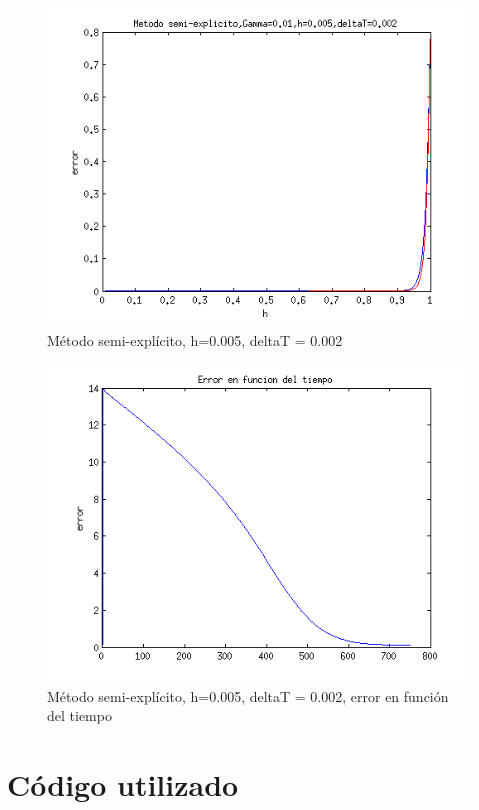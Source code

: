 \documentclass[11pt]{article}
\begin{document}
\begin{figure}[tbh]
	\centering
		\includegraphics[width=1.0\textwidth]{imagen21.png}
	\caption{M\'etodo semi-expl\'icito, h=0.005, deltaT = 0.002}
	\label{fig:Fig1}
\end{figure}

\begin{figure}[tbh]
	\centering
		\includegraphics[width=1.0\textwidth]{imagen22.png}
	\caption{M\'etodo semi-expl\'icito, h=0.005, deltaT = 0.002, error en funci\'on del tiempo}
	\label{fig:Fig1}
\end{figure}


\section{C\'odigo utilizado}
\end{document}
